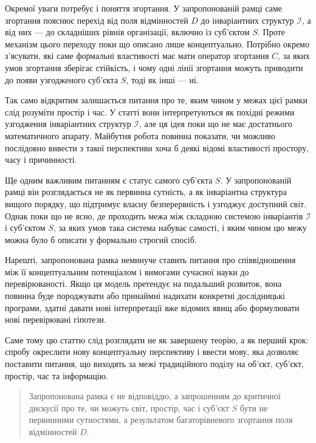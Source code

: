 \documentclass[aps,prd,onecolumn,nofootinbib,superscriptaddress]{revtex4-2} %
\begin{document}
    Окремої уваги потребує і поняття згортання. У запропонованій рамці саме згортання пояснює перехід від поля відмінностей \(D\) до інваріантних структур \(\mathcal{I}\), а від них — до складніших рівнів організації, включно із суб’єктом \(S\). Проте механізм цього переходу поки що описано лише концептуально. Потрібно окремо з’ясувати, які саме формальні властивості має мати оператор згортання \(C\), за яких умов згортання зберігає стійкість, і чому одні лінії згортання можуть приводити до появи узгодженого суб’єкта \(S\), тоді як інші — ні.

    Так само відкритим залишається питання про те, яким чином у межах цієї рамки слід розуміти простір і час. У статті вони інтерпретуються як похідні режими узгодження інваріантних структур \(\mathcal{I}\), але ця ідея поки що не має достатнього математичного апарату. Майбутня робота повинна показати, чи можливо послідовно вивести з такої перспективи хоча б деякі відомі властивості простору, часу і причинності.

    Ще одним важливим питанням є статус самого суб’єкта \(S\). У запропонованій рамці він розглядається не як первинна сутність, а як інваріантна структура вищого порядку, що підтримує власну безперервність і узгоджує доступний світ. Однак поки що не ясно, де проходить межа між складною системою інваріантів \(\mathcal{I}\) і суб’єктом \(S\), за яких умов така система набуває самості, і яким чином цю межу можна було б описати у формально строгий спосіб.

    Нарешті, запропонована рамка неминуче ставить питання про співвідношення між її концептуальним потенціалом і вимогами сучасної науки до перевірюваності. Якщо ця модель претендує на подальший розвиток, вона повинна буде породжувати або принаймні надихати конкретні дослідницькі програми, здатні давати нові інтерпретації вже відомих явищ або формулювати нові перевірювані гіпотези.

    Саме тому цю статтю слід розглядати не як завершену теорію, а як перший крок: спробу окреслити нову концептуальну перспективу і ввести мову, яка дозволяє поставити питання, що виходять за межі традиційного поділу на об’єкт, суб’єкт, простір, час та інформацію.

    \begin{quote}
        Запропонована рамка є не відповіддю, а запрошенням до критичної дискусії про те, чи можуть світ, простір, час і суб’єкт \(S\) бути не первинними сутностями, а результатом багаторівневого згортання поля відмінностей \(D\).
    \end{quote}
\end{document}
